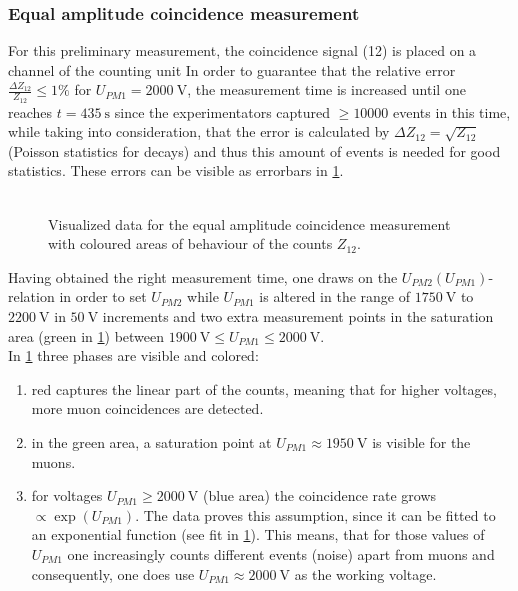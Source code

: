 \documentclass[english,  %
parskip=full,   %
headsepline]{scrartcl}
\begin{document}
\subsubsection{Equal amplitude coincidence measurement}
For this preliminary measurement, the coincidence signal (12) is placed on a channel of the counting unit
In order to guarantee that the relative error $\frac{\Delta Z_{12}}{Z_{12}} \le 1\%$ for $U_{PM1}=\SI{2000}{\volt}$, the measurement time is increased until one reaches $t=\SI{435}{\second}$ since the experimentators captured $\ge 10000$ events in this time, while taking into consideration, that the error is calculated by $\Delta Z_{12}=\sqrt{Z_{12}}$ (Poisson statistics for decays) and thus this amount of events is needed for good statistics. These errors can be visible as errorbars in \cref{fig:vorversuch2}. \\\\
\begin{figure}[H]
    \centering
    
    \caption{Visualized data for the equal amplitude coincidence measurement with coloured areas of behaviour of the counts $Z_{12}$.}
    \label{fig:vorversuch2}
\end{figure}
Having obtained the right measurement time, one draws on the $U_{PM2}(U_{PM1})$-relation in order to set $U_{PM2}$ while $U_{PM1}$ is altered in the range of $\SI{1750}{\volt}$ to $\SI{2200}{\volt}$ in $\SI{50}{\volt}$ increments and two extra measurement points in the saturation area (green in \cref{fig:vorversuch2}) between $\SI{1900}{\volt}\le U_{PM1} \le \SI{2000}{\volt}$.\\
In \cref{fig:vorversuch2} three phases are visible and colored: 
\begin{enumerate}
    \item red captures the linear part of the counts, meaning that for higher voltages, more muon coincidences are detected.
    \item in the green area, a saturation point at $ U_{PM1} \approx \SI{1950}{\volt}$ is visible for the muons.
    \item for voltages $U_{PM1} \ge \SI{2000}{\volt}$ (blue area) the coincidence rate grows $\propto \exp(U_{PM1})$.
    The data proves this assumption, since it can be fitted to an exponential function (see fit in \cref{fig:vorversuch2}).
    This means, that for those values of $U_{PM1}$ one increasingly counts different events (noise) apart from muons and consequently, one does use $U_{PM1} \approx \SI{2000}{\volt}$ as the working voltage.
\end{enumerate}
\end{document}
